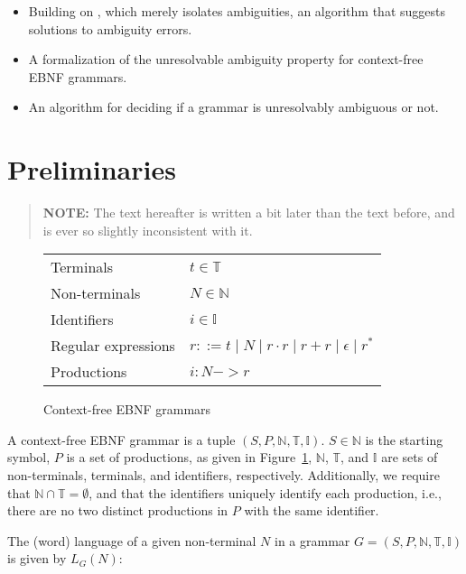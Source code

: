 \documentclass[sigplan]{acmart}\settopmatter{printfolios=true,printccs=false,printacmref=false}
\newcommand{\NT}{\mathbb{N}} %
\newcommand{\T}{\mathbb{T}} %
\newcommand{\I}{\mathbb{I}} %
\begin{document}
\begin{itemize}
  \item Building on \cite{palmkvistCreatingDomainSpecificLanguages2019}, which merely isolates ambiguities, an algorithm that suggests solutions to ambiguity errors.
  \item A formalization of the unresolvable ambiguity property for context-free EBNF grammars.
  \item An algorithm for deciding if a grammar is unresolvably ambiguous or not.
\end{itemize}

\section{Preliminaries}

\begin{quote} %
  \textbf{NOTE:} The text hereafter is written a bit later than the text before, and is ever so slightly inconsistent with it.
\end{quote}

\begin{figure}
  \begin{tabular}{@{}ll@{}}
      Terminals & $t \in \T$ \\
      Non-terminals & $N \in \NT$ \\
      Identifiers & $i \in \I$ \\
      Regular expressions & $r ::= t \mid N \mid r \cdot r \mid r + r \mid \epsilon \mid r^{*}$ \\
      Productions & $i : N -> r$ \\
  \end{tabular}
  \caption{Context-free EBNF grammars}
  \label{fig:grammar-definition}
\end{figure}

A context-free EBNF grammar is a tuple $(S, P, \NT, \T, \I)$. $S \in \NT$ is the starting symbol, $P$ is a set of productions, as given in Figure~\ref{fig:grammar-definition}, $\NT$, $\T$, and $\I$ are sets of non-terminals, terminals, and identifiers, respectively. Additionally, we require that $\NT \cap \T = \emptyset$, and that the identifiers uniquely identify each production, i.e., there are no two distinct productions in $P$ with the same identifier.

The (word) language of a given non-terminal $N$ in a grammar $G = (S, P, \NT, \T, \I)$ is given by $L_G(N)$:
\end{document}
